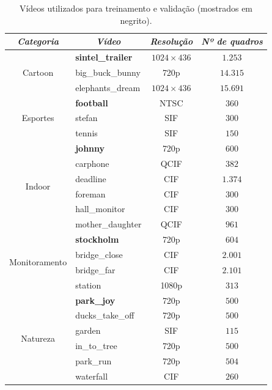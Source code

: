 \documentclass[cic,tc]{iiufrgs}
\begin{document}
\begin{table}[h]
    \caption{Vídeos utilizados para treinamento e validação (mostrados em negrito).}
    \centering
        \begin{tabular}{|c|l|c|c|}
          \hline
          \multicolumn{1}{|c}{\textit{Categoria}} & 
          \multicolumn{1}{|c}{\textit{Vídeo}} & 
          \multicolumn{1}{|c}{\textit{Resolução}} & 
          \multicolumn{1}{|c|}{\textit{Nº de quadros}}  \\
          \hline
          \hline
          \multirow{3}{*}{Cartoon} 
          & \textbf{sintel\_trailer} & $1024\times436$ & $ 1.253 $ \\ 
          & big\_buck\_bunny & 720p & $ 14.315 $ \\
          & elephants\_dream & $1024\times436$ & $ 15.691 $ \\
          \hline
          \multirow{3}{*}{Esportes} 
          & \textbf{football} & NTSC & $360$ \\
          & stefan & SIF & $300$ \\ 
          & tennis & SIF & $150$ \\
          \hline
          \multirow{6}{*}{Indoor} 
          & \textbf{johnny} & 720p & $600$ \\ 
          & carphone & QCIF & $382$ \\
          & deadline & CIF & $1.374$ \\
          & foreman & CIF & $300$ \\
          & hall\_monitor & CIF & $300$ \\
          & mother\_daughter & QCIF & $961$ \\
          \hline
          \multirow{4}{*}{Monitoramento} 
          & \textbf{stockholm} & 720p & $604$ \\ 
          & bridge\_close & CIF & $2.001$ \\
          & bridge\_far & CIF & $2.101$ \\
          & station & 1080p & $313$ \\
          \hline 
          \multirow{6}{*}{Natureza} 
          & \textbf{park\_joy} & 720p & $500$ \\
          & ducks\_take\_off & 720p & $500$ \\
          & garden & SIF & $115$ \\
          & in\_to\_tree & 720p & $500$ \\
          & park\_run & 720p & $504$ \\
          & waterfall & CIF & $260$ \\
          \hline
        \end{tabular}
    \label{tbl:vidtrain}
\end{table}
\end{document}
